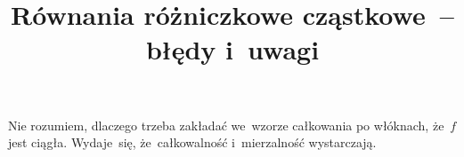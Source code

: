 \documentclass[a4paper,11pt]{article}
\title{Równania różniczkowe cząstkowe~-- błędy i~uwagi}
\begin{document}





\maketitle %









\start {}

\vspace{\spaceFour}



\start {} Nie rozumiem, dlaczego trzeba zakładać we~wzorze
całkowania po włóknach, że~$f$ jest ciągła. Wydaje~się,
że~całkowalność i~mierzalność wystarczają.

\vspace{\spaceFour}





\end{document}
